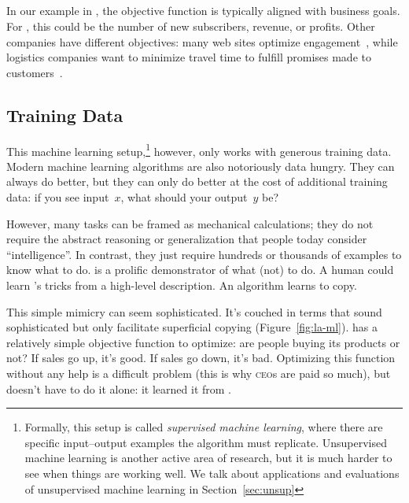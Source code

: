\subsection{}

In our example in \crunchyCity{}, the objective function is typically
aligned with business goals.
%
For \energyCompany{}, this could be the number of new subscribers,
revenue, or profits.
%
Other companies have different objectives: many web sites optimize
engagement~\citep{hoiles-17}, while logistics companies want to
minimize travel time to fulfill promises made to customers~\citep{fiat-16}.

\subsection{Training Data}

This machine learning setup,\footnote{Formally, this setup is called
  \emph{supervised machine learning}, where there are specific
  input--output examples the algorithm must replicate.  Unsupervised
  machine learning is another active area of research, but it is much
  harder to see when things are working well.  We talk about
  applications and evaluations of unsupervised machine learning in
  Section~\ref{sec:unsup}} however, only works with generous training
data.  Modern machine learning algorithms are also notoriously data
hungry.  They can always do better, but they can only do better at the
cost of additional training data: if you see input~$x$, what should
your output~$y$ be?

However, many tasks can be framed as mechanical calculations; they
do not require the abstract reasoning or generalization that people today
consider ``intelligence''.  In contrast, they just require hundreds
or thousands of examples to know what to do.  \energyJerk{} is a
prolific demonstrator of what (not) to do.  A human could learn
\energyJerk{}'s tricks from a high-level description.  An algorithm
learns to copy. 

This simple mimicry can seem sophisticated.  It's couched in terms
that sound sophisticated but only facilitate superficial copying
(Figure~\ref{fig:la-ml}).  \energyCompany{} has a relatively simple
objective function to optimize: are people buying its
products or not?  If sales go up, it's good.  If sales go down, it's
bad.  Optimizing this function without any help is a difficult problem
(this is why \textsc{ceo}s are paid so much), but \energyCompany{}
doesn't have to do it alone: it learned it from \energyJerk{}.

